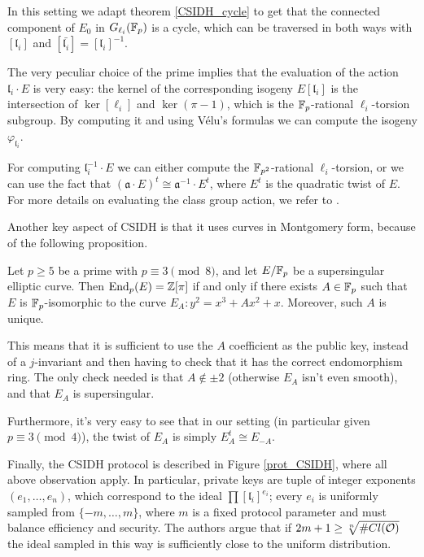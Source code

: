 In this setting we adapt theorem \ref{CSIDH_cycle} to get that the connected component of $E_0$ in $G_{\ell_i}(\mathbb{F}_p)$ is a cycle, which can be traversed in both ways with $[\mathfrak{l}_i]$ and $[\bar{\mathfrak{l}_i}]=[\mathfrak{l}_i]^{-1}$.

The very peculiar choice of the prime implies that the evaluation of the action $\mathfrak{l}_i\cdot E$ is very easy: the kernel of the corresponding isogeny $E[\mathfrak{l}_i]$ is the intersection of $\ker[\ell_i]$ and $\ker(\pi-1)$, which is the $\mathbb{F}_p$-rational $\ell_i$-torsion subgroup. By computing it and using Vélu's formulas we can compute the isogeny $\varphi_{\mathfrak{l}_i}$.

For computing $\mathfrak{l}_i^{-1}\cdot E$ we can either compute the $\mathbb{F}_{p^2}$-rational $\ell_i$-torsion, or we can use the fact that $(\mathfrak{a}\cdot E)^t\cong\mathfrak{a}^{-1}\cdot E^t$, where $E^t$ is the quadratic twist of $E$. For more details on evaluating the class group action, we refer to \cite[section 8]{CSIDH}.

Another key aspect of CSIDH is that it uses curves in Montgomery form, because of the following proposition.
\begin{proposition}
    Let $p\ge5$ be a prime with $p\equiv3\pmod8$, and let $E/\mathbb{F}_p$ be a supersingular elliptic curve. Then $\operatorname{End}_p(E)=\mathbb{Z}[\pi]$ if and only if there exists $A\in\mathbb{F}_p$ such that $E$ is $\mathbb{F}_p$-isomorphic to the curve $E_A:y^2=x^3+Ax^2+x$. Moreover, such $A$ is unique.
\end{proposition}

This means that it is sufficient to use the $A$ coefficient as the public key, instead of a $j$-invariant and then having to check that it has the correct endomorphism ring. The only check needed is that $A\not\in{\pm2}$ (otherwise $E_A$ isn't even smooth), and that $E_A$ is supersingular.

Furthermore, it's very easy to see that in our setting (in particular given $p\equiv3\pmod 4$), the twist of $E_A$ is simply $E_A^t\cong E_{-A}$.

Finally, the CSIDH protocol is described in Figure \ref{prot_CSIDH}, where all above observation apply. In particular, private keys are tuple of integer exponents $(e_1,\dots,e_n)$, which correspond to the ideal $\prod [\mathfrak{l}_i]^{e_i}$; every $e_i$ is uniformly sampled from $\{ -m,\dots,m \}$, where $m$ is a fixed protocol parameter and must balance efficiency and security. The authors argue that if $2m+1\ge\sqrt[n]{\# Cl(\mathcal{O})}$ the ideal sampled in this way is sufficiently close to the uniform distribution.

